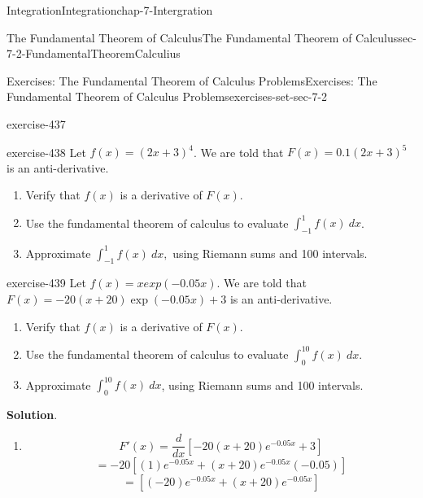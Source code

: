 \documentclass[oneside,10pt,]{book}
\numberwithin{equation}{section}
\begin{document}
\begin{chapterptx}{Integration}{}{Integration}{}{}{chap-7-Intergration}
\begin{sectionptx}{The Fundamental Theorem of Calculus}{}{The Fundamental Theorem of Calculus}{}{}{sec-7-2-FundamentalTheoremCalculius}
\begin{exercises-subsection-numberless}{Exercises: The Fundamental Theorem of Calculus Problems}{}{Exercises: The Fundamental Theorem of Calculus Problems}{}{}{exercises-set-sec-7-2}
\begin{divisionexercise}{3}{}{}{exercise-437}
\begin{enumerate}[label=(\alph*)]
\end{enumerate}
\end{divisionexercise}%
\begin{divisionexercise}{4}{}{}{exercise-438}%
\hypertarget{p-2673}{}%
Let \(f(x) = (2 x +3)^4\).  We are told that \(F(x) = 0.1 (2 x + 3)^5\) is an anti-derivative.%
\leavevmode%
\begin{enumerate}[label=(\alph*)]
\item\hypertarget{li-725}{}\hypertarget{p-2674}{}%
Verify that \(f(x)\) is a derivative of \(F(x)\).%
\item\hypertarget{li-726}{}\hypertarget{p-2675}{}%
Use the fundamental theorem of calculus to evaluate \(\int_{-1}^1 f(x)\ dx\).%
\item\hypertarget{li-727}{}\hypertarget{p-2676}{}%
Approximate \(\int_{-1}^1 f(x)\ dx,\) using Riemann sums and 100 intervals.%
\end{enumerate}
\end{divisionexercise}%
\begin{divisionexercise}{5}{}{}{exercise-439}%
\hypertarget{p-2677}{}%
Let \(f(x) = x exp(-0.05 x)\).  We are told that \(F(x) = -20 (x+20) \exp(-0.05x)+3\) is an anti-derivative.%
\leavevmode%
\begin{enumerate}[label=(\alph*)]
\item\hypertarget{li-728}{}\hypertarget{p-2678}{}%
Verify that \(f(x)\) is a derivative of \(F(x)\).%
\item\hypertarget{li-729}{}\hypertarget{p-2679}{}%
Use the fundamental theorem of calculus to evaluate \(\int_0^{10} f(x)\ dx\).%
\item\hypertarget{li-730}{}\hypertarget{p-2680}{}%
Approximate \(\int_0^{10} f(x)\ dx\), using Riemann sums and 100 intervals.%
\end{enumerate}
\par\smallskip%
\noindent\textbf{Solution}.\hypertarget{solution-222}{}\quad%
\leavevmode%
\begin{enumerate}[label=(\alph*)]
\item\hypertarget{li-731}{}%
\begin{equation*}
F'(x)=\frac{d}{dx}  [-20(x+20)  e^{-0.05x}+3]
\end{equation*}
%
\begin{equation*}
=-20 [(1)  e^{-0.05x}+(x+20)  e^{-0.05x} (-0.05)] 
\end{equation*}
%
\begin{equation*}
= [(-20)  e^{-0.05x}+(x+20)  e^{-0.05x}]    
\end{equation*}

\end{enumerate}
\end{divisionexercise}
\end{exercises-subsection-numberless}
\end{sectionptx}
\end{chapterptx}
\end{document}
